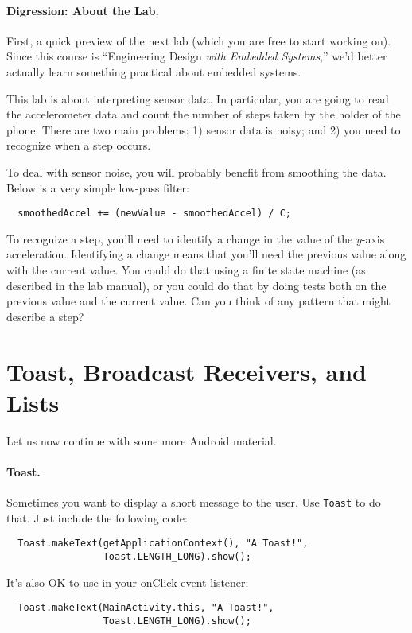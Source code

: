 \paragraph{Digression: About the Lab.} First, a quick preview of 
the next lab (which you are free to start working on). Since this
course is ``Engineering Design \emph{with Embedded Systems},'' we'd
better actually learn something practical about embedded systems.

This lab is about interpreting sensor data. In particular, you are going to
read the accelerometer data and count the number of steps taken by the holder
of the phone. There are two main problems: 1) sensor data is noisy; and 2) you need
to recognize when a step occurs.

To deal with sensor noise, you will probably benefit from smoothing the data.
Below is a very simple low-pass filter:

\begin{lstlisting}
  smoothedAccel += (newValue - smoothedAccel) / C;
\end{lstlisting}

To recognize a step, you'll need to identify a change in the value of the $y$-axis
acceleration. Identifying a change means that you'll need the previous value along
with the current value. You could do that using a finite state machine (as described
in the lab manual), or you could do that by doing tests both on the previous value 
and the current value. Can you think of any pattern that might describe a step?

\section*{Toast, Broadcast Receivers, and Lists}

Let us now continue with some more Android material.

\paragraph{Toast.} Sometimes you want to display a short message to the user.
Use {\tt Toast} to do that. Just include the following code:
\begin{lstlisting}
  Toast.makeText(getApplicationContext(), "A Toast!", 
                 Toast.LENGTH_LONG).show();
\end{lstlisting}
It's also OK to use in your onClick event listener:
\begin{lstlisting}
  Toast.makeText(MainActivity.this, "A Toast!", 
                 Toast.LENGTH_LONG).show();
\end{lstlisting}

